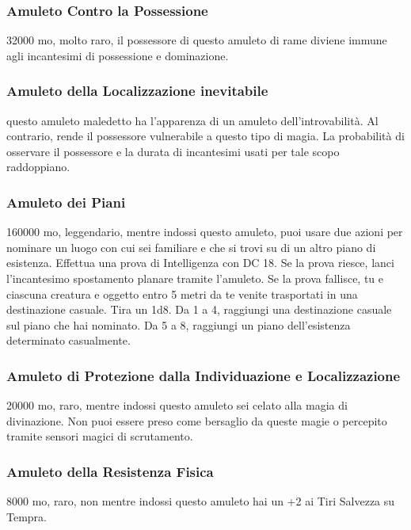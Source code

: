 \begin{multicols}{2}
\subsubsection*{Amuleto Contro la Possessione}
32000 mo, molto raro, il possessore di questo amuleto di rame diviene immune agli incantesimi di possessione e dominazione.

\subsubsection*{Amuleto della Localizzazione inevitabile}
questo amuleto maledetto ha l'apparenza di un amuleto dell'introvabilità. Al contrario, rende il possessore vulnerabile a questo tipo di magia. La probabilità di osservare il possessore e la durata di incantesimi usati per tale scopo raddoppiano.

\subsubsection*{Amuleto dei Piani}
160000 mo, leggendario, mentre indossi questo amuleto, puoi usare due azioni per nominare un luogo con cui sei familiare e che si trovi su di un altro piano di esistenza. Effettua una prova di Intelligenza con DC 18. Se la prova riesce, lanci l'incantesimo spostamento planare tramite l'amuleto. Se la prova fallisce, tu e ciascuna creatura e oggetto entro 5 metri da te venite trasportati in una destinazione casuale. Tira un 1d8. Da 1 a 4, raggiungi una destinazione casuale sul piano che hai nominato. Da 5 a 8, raggiungi un piano dell'esistenza determinato casualmente.

\subsubsection*{Amuleto di Protezione dalla Individuazione e Localizzazione}
20000 mo, raro, mentre indossi questo amuleto sei celato alla magia di divinazione. Non puoi essere preso come bersaglio da queste magie o percepito tramite sensori magici di scrutamento.

\subsubsection*{Amuleto della Resistenza Fisica}
8000 mo, raro, non mentre indossi questo amuleto hai un +2 ai Tiri Salvezza su Tempra.


\end{multicols}
